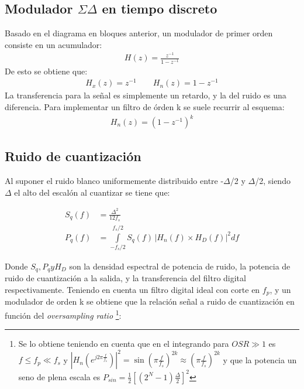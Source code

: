 \documentclass[a4paper,conference]{IEEEtran}
\begin{document}
\subsection{Modulador $\Sigma\Delta$ en tiempo discreto}
Basado en el diagrama en bloques anterior, un modulador de primer orden consiste en un acumulador:
\begin{align}
H(z)=\frac{z^{-1}}{1-z^{-1}}
\end{align}
De esto se obtiene que:
\begin{align}
H_x(z)=z^{-1} \qquad
H_n(z)=1-z^{-1}
\end{align}
La transferencia para la señal es simplemente un retardo, y la del ruido es una diferencia.
Para implementar un filtro de \'orden k se suele recurrir al esquema:
\begin{align}
H_n(z)=\left( 1-z^{-1}\right)^{k}
\end{align}

\subsection{Ruido de cuantizaci\'on}
Al suponer el ruido blanco uniformemente distribuido entre -$\Delta$/2 y $\Delta$/2, siendo $\Delta$ el alto del escal\'on al cuantizar se tiene que:

\begin{align}
S_q(f) &= \frac{\Delta^{2}}{12f_s}\\
P_{q}(f) &=\int\limits_{-f_s/2}^{f_s/2}S_q(f) \, |H_n(f) \times H_D(f)|^{2} df
\end{align}

Donde $S_q,P_q y H_D$ son la densidad espectral de potencia de ruido, la potencia de ruido de cuantizaci\'on a la salida, y la transferencia del filtro digital respectivamente.
Teniendo en cuenta un filtro digital ideal con corte en $f_p$, y un modulador de orden k se obtiene que la relaci\'on se\~nal a ruido de cuantizaci\'on en funci\'on del \textit{oversampling ratio}
\footnote[1]{
Se lo obtiene teniendo en cuenta que en el integrando para $OSR\gg 1$ es $f\leq f_p\ll f_s$ y $|H_n(e^{j2 \pi \frac{f}{f_s}})|^{2}= \sin(\pi \frac{f}{f_s})^{2k} \approx (\pi\frac{f}{f_s})^{2k}$ y que la potencia un seno de plena escala es $P_{sin}=\frac{1}{2} [(2^N-1)\frac{\Delta}{2}]^{2}$
}:
\end{document}

